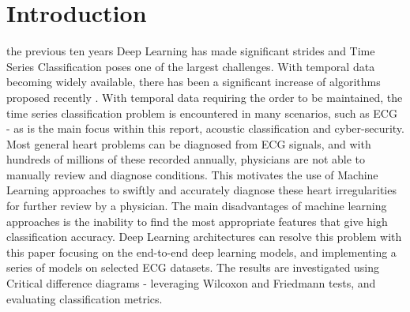 \documentclass[journal]{IEEEtran}
\begin{document}
\section{Introduction}
% 
% 
% 
% 
 the previous ten years Deep Learning has made significant strides and Time Series Classification poses one of the largest challenges. With temporal data becoming widely available, there has been a significant increase of algorithms proposed recently \cite{IsmailFawaz2018deep}. With temporal data requiring the order to be maintained, the time series classification problem is encountered in many scenarios, such as ECG - as is the main focus within this report, acoustic classification and cyber-security. Most general heart problems can be diagnosed from ECG signals, and with hundreds of millions of these recorded annually, physicians are not able to manually review and diagnose conditions. This motivates the use of Machine Learning approaches to swiftly and accurately diagnose these heart irregularities for further review by a physician. The main disadvantages of machine learning approaches is the inability to find the most appropriate features that give high classification accuracy. Deep Learning architectures can resolve this problem with this paper focusing on the end-to-end deep learning models, and implementing a series of models on selected ECG datasets. The results are investigated using Critical difference diagrams - leveraging Wilcoxon and Friedmann tests, and evaluating classification metrics. 
\end{document}
